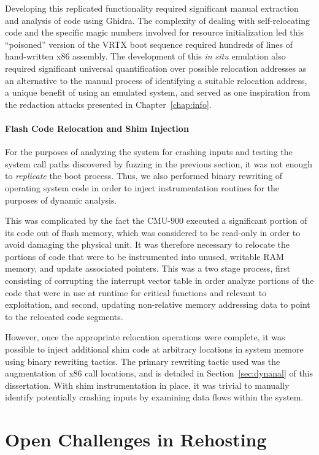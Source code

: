 Developing this replicated functionality required significant manual extraction and analysis of code using Ghidra.
The complexity of dealing with self-relocating code and the specific magic numbers involved for resource initialization led this ``poisoned'' version of the VRTX boot sequence required hundreds of lines of hand-written x86 assembly.
The development of this \emph{in situ} emulation also required significant universal quantification over possible relocation addresses as an alternative to the manual process of identifying a suitable relocation address, a unique benefit of using an emulated system, and served as one inspiration from the redaction attacks presented in Chapter~\ref{chap:info}.

\paragraph{Flash Code Relocation and Shim Injection}
For the purposes of analyzing the system for crashing inputs and testing the system call paths discovered by fuzzing in the previous section, it was not enough to \emph{replicate} the boot process.
Thus, we also performed binary rewriting of operating system code in order to inject instrumentation routines for the purposes of dynamic analysis.

This was complicated by the fact the CMU-900 executed a significant portion of its code out of flash memory, which was considered to be read-only in order to avoid damaging the physical unit.
It was therefore necessary to relocate the portions of code that were to be instrumented into unused, writable RAM memory, and update associated pointers.
This was a two stage process, first consisting of corrupting the interrupt vector table in order analyze portions of the code that were in use at runtime for critical functions and relevant to exploitation, and second, updating non-relative memory addressing data to point to the relocated code segments.

However, once the appropriate relocation operations were complete, it was possible to inject additional shim code at arbitrary locations in system memore using binary rewriting tactics.
The primary rewriting tactic used was the augmentation of x86 call locations, and is detailed in Section~\ref{sec:dynanal} of this dissertation.
With shim instrumentation in place, it was trivial to manually identify potentially crashing inputs by examining data flows within the system.

\section{Open Challenges in Rehosting} 
\label{sec:jetset-limitations}

